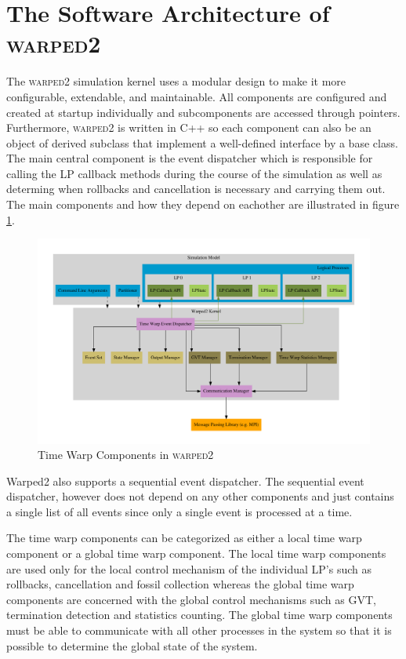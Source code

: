 \documentclass[11pt]{book}
\begin{document}
\section{The Software Architecture of \textsc{warped2}}

The \textsc{warped2} simulation kernel uses a modular design to make it more configurable,
extendable, and maintainable. All components are configured and created at startup individually
and subcomponents are accessed through pointers. Furthermore, \textsc{warped2} is written in
C++ so each component can also be an object of derived subclass that implement a well-defined
interface by a base class. The main central component is the event dispatcher which is responsible
for calling the LP callback methods during the course of the simulation as well as determing
when rollbacks and cancellation is necessary and carrying them out. The main components and
how they depend on eachother are illustrated in figure \ref{warped2_architecture}.

\begin{figure}[H]
    \centering
    \includegraphics[width=\textwidth,quiet]{figs/graphviz/warped2_overview.pdf}
    \caption{Time Warp Components in \textsc{warped2}}\label{warped2_architecture}
\end{figure}

Warped2 also supports a sequential event dispatcher. The sequential event dispatcher, however
does not depend on any other components and just contains a single list of all events since
only a single event is processed at a time.

The time warp components can be categorized as either a local time warp component or a global
time warp component. The local time warp components are used only for the local control
mechanism of the individual LP's such as rollbacks, cancellation and fossil collection whereas
the global time warp components are concerned with the global control mechanisms such as GVT,
termination detection and statistics counting. The global time warp components must be able to
communicate with all other processes in the system so that it is possible to determine the
global state of the system.
\end{document}
